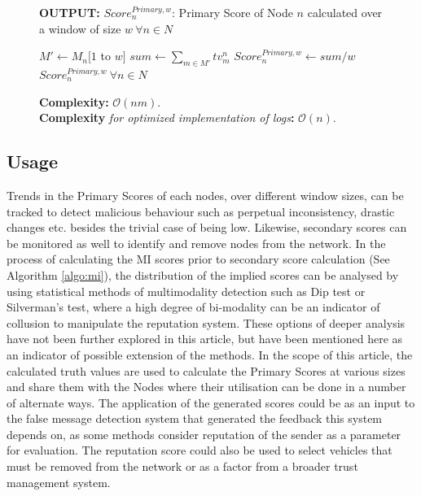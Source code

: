 \documentclass[journal]{IEEEtran}
\begin{document}
\begin{figure}[!t]
\begin{algorithm}[H]
\begin{enumerate}
	\end{enumerate}
	\textbf{OUTPUT:} $ Score^{Primary,w}_n $: Primary Score of Node $ n $ calculated over a window of size $ w\ \forall n\in N$
	\begin{algorithmic}[1]
			\STATE $ M' \leftarrow M_n[1$ to $w] $
			\STATE $ sum \leftarrow \sum_{m\in M'}tv^n_m $ 
			\STATE $ Score^{Primary,w}_n \leftarrow sum/w $ 
		\ENDFOR
		\RETURN $ Score^{Primary,w}_n\ \forall n\in N$
	\end{algorithmic}
	\textbf{Complexity:} $\mathcal{O}(nm)$.\\
	\textbf{Complexity}\textit{ for optimized implementation of logs}\textbf{:} $\mathcal{O}(n)$.
\end{algorithm}
\end{figure}
\subsection{Usage}
\label{sec:PM:usage}
Trends in the Primary Scores of each nodes, over different window sizes, can be tracked to detect malicious behaviour such as perpetual inconsistency, drastic changes etc. besides the trivial case of being low. Likewise, secondary scores can be monitored as well to identify and remove nodes from the network. In the process of calculating the MI scores prior to secondary score calculation (See Algorithm \ref{algo:mi}), the distribution of the implied scores can be analysed by using statistical methods of multimodality detection such as Dip test\cite{c:DipTest} or Silverman's test\cite{c:SilvermansTest}, where a high degree of bi-modality can be an indicator of collusion to manipulate the reputation system. These options of deeper analysis have not been further explored in this article, but have been mentioned here as an indicator of possible extension of the methods. In the scope of this article, the calculated truth values are used to calculate the Primary Scores at various sizes and share them with the Nodes where their utilisation can be done in a number of 
alternate
ways. The application of the generated scores could be as an input to the false message detection system that generated the feedback this system depends on, as some methods consider reputation of the sender as a parameter for evaluation\cite{c:messagefilterCoE}. The reputation score could also be used to select vehicles that must be removed from the network or as a factor from a broader trust management system\cite{c:trustInSIoV}.
\end{document}

